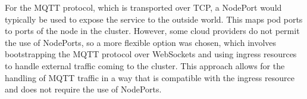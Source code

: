 For the MQTT protocol, which is transported over TCP, a NodePort would typically be used to expose the service to the outside world. This maps pod ports to ports of the node in the cluster. However, some cloud providers do not permit the use of NodePorts, so a more flexible option was chosen, which involves bootstrapping the MQTT protocol over WebSockets and using ingress resources to handle external traffic coming to the cluster. This approach allows for the handling of MQTT traffic in a way that is compatible with the ingress resource and does not require the use of NodePorts.